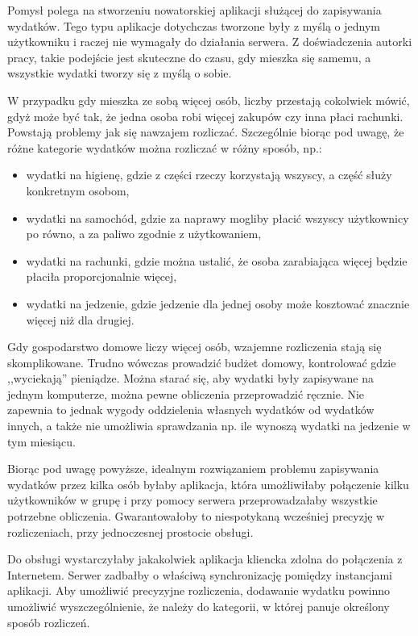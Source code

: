 \documentclass[12pt,a4paper,twoside,titlepage,openright]{book}
\begin{document}
Pomysł polega na stworzeniu nowatorskiej aplikacji służącej do zapisywania wydatków. Tego typu aplikacje dotychczas tworzone były z myślą o jednym użytkowniku i raczej nie wymagały do działania serwera. Z doświadczenia autorki pracy, takie podejście jest skuteczne do czasu, gdy mieszka się samemu, a wszystkie wydatki tworzy się z myślą o sobie. 

W przypadku gdy mieszka ze sobą więcej osób, liczby przestają cokolwiek mówić, gdyż może być tak, że jedna osoba robi więcej zakupów czy inna płaci rachunki. Powstają problemy jak się nawzajem rozliczać. Szczególnie biorąc pod uwagę, że różne kategorie wydatków można rozliczać w różny sposób, np.:
\begin{itemize}
\item wydatki na higienę, gdzie z części rzeczy korzystają wszyscy, a część służy konkretnym osobom,
\item wydatki na samochód, gdzie za naprawy mogliby płacić wszyscy użytkownicy po równo, a za paliwo zgodnie z użytkowaniem,
\item wydatki na rachunki, gdzie można ustalić, że osoba zarabiająca więcej będzie płaciła proporcjonalnie więcej,
\item wydatki na jedzenie, gdzie jedzenie dla jednej osoby może kosztować znacznie więcej niż dla drugiej.
\end{itemize}
Gdy gospodarstwo domowe liczy więcej osób, wzajemne rozliczenia stają się skomplikowane. Trudno wówczas prowadzić budżet domowy, kontrolować gdzie ,,wyciekają'' pieniądze. Można starać się, aby wydatki były zapisywane na jednym komputerze, można pewne obliczenia przeprowadzić ręcznie. Nie zapewnia to jednak wygody oddzielenia własnych wydatków od wydatków innych, a także nie umożliwia sprawdzania np. ile wynoszą wydatki na jedzenie w tym miesiącu.

Biorąc pod uwagę powyższe, idealnym rozwiązaniem problemu zapisywania wydatków przez kilka osób byłaby aplikacja, która umożliwiłaby połączenie kilku użytkowników w grupę i przy pomocy serwera przeprowadzałaby wszystkie potrzebne obliczenia. Gwarantowałoby to niespotykaną wcześniej precyzję w rozliczeniach, przy jednoczesnej prostocie obsługi. 

Do obsługi wystarczyłaby jakakolwiek aplikacja kliencka zdolna do połączenia z Internetem. Serwer zadbałby o właściwą synchronizację pomiędzy instancjami aplikacji. Aby umożliwić precyzyjne rozliczenia, dodawanie wydatku powinno umożliwić wyszczególnienie, że należy do kategorii, w której panuje określony sposób rozliczeń. 
\end{document}
